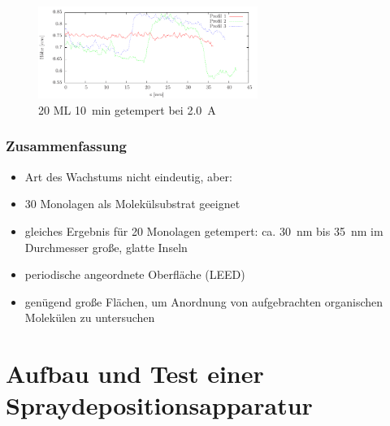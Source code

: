 \documentclass{beamer}
\begin{document}
\begin{frame}
\begin{figure}[H]
\begin{minipage}[b]{0.45\textwidth}
		\caption*{20 ML \SI{10}{min} getempert bei \SI{2,0}{A}}
	\end{minipage}
	\centering
		\includegraphics[height=3cm]{bilder/profiles20MLget}
\end{figure}
\end{frame}

\begin{frame}
\frametitle{Zusammenfassung}
\begin{itemize}\setlength{\itemsep}{+15pt}
  \item Art des Wachstums nicht eindeutig, aber:
  \item 30 Monolagen als Molekülsubstrat geeignet
  \item gleiches Ergebnis für 20 Monolagen getempert: ca. \SI{30}{nm} bis \SI{35}{nm} im Durchmesser
  große, glatte Inseln
  \item periodische angeordnete Oberfläche (LEED)
  \item genügend große Flächen, um Anordnung von aufgebrachten organischen Molekülen zu untersuchen
\end{itemize}
\end{frame}




\section{Aufbau und Test einer Spraydepositionsapparatur}
\end{document}
